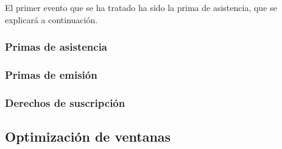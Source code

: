 \documentclass[titlepage]{article}
\begin{document}
El primer evento que se ha tratado ha sido la prima de asistencia, que se explicará a continuación.

\subsubsection{Primas de asistencia}
\subsubsection{Primas de emisión}
\subsubsection{Derechos de suscripción}
\subsection{Optimización de ventanas}
\end{document}
